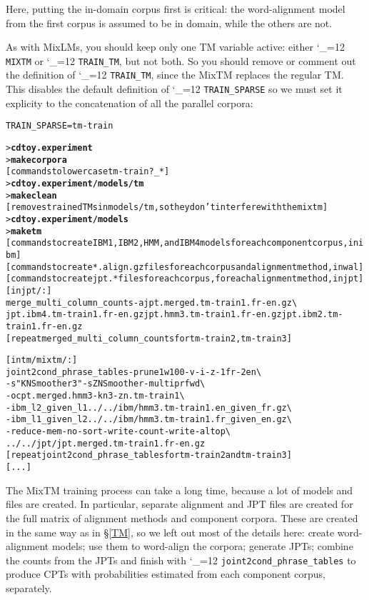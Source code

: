 \documentclass[11pt,letterpaper]{article}
\newcommand{\bs}{\textbackslash{}}
\def\code{\begingroup\catcode`\_=12 \codex}
\newcommand{\codex}[1]{\texttt{#1}\endgroup}
\begin{document}
Here, putting the in-domain corpus first is critical:
the word-alignment model from the first corpus is assumed to be
in domain, while the others are not.

As with MixLMs, you should keep only one TM variable active: either \code{MIXTM} or \code{TRAIN_TM}, but not both.
So you should remove or comment out the definition of \code{TRAIN_TM}, since the
MixTM replaces the regular TM.
This disables the default definition of \code{TRAIN_SPARSE}
so we must set it explicity to the concatenation of all the parallel corpora:
\begin{small}
\begin{alltt}
   TRAIN_SPARSE = tm-train
\end{alltt}
\end{small}

\begin{small}
\begin{alltt}
   > \textbf{cd toy.experiment}
   > \textbf{make corpora}
   [commands to lowercase tm-train?_*]
   > \textbf{cd toy.experiment/models/tm}
   > \textbf{make clean}
   [removes trained TMs in models/tm, so they don't interfere with the mixtm]
   > \textbf{cd toy.experiment/models}
   > \textbf{make tm}
   [commands to create IBM1, IBM2, HMM, and IBM4 models for each component corpus, in ibm]
   [commands to create *.align.gz files for each corpus and alignment method, in wal]
   [commands to create jpt.* files for each corpus, for each alignment method, in jpt]
   [in jpt/:]
   merge_multi_column_counts -a jpt.merged.tm-train1.fr-en.gz \bs
      jpt.ibm4.tm-train1.fr-en.gz jpt.hmm3.tm-train1.fr-en.gz jpt.ibm2.tm-train1.fr-en.gz
   [repeat merged_multi_column_counts for tm-train2, tm-train3]

   [in tm/mixtm/:]
   joint2cond_phrase_tables -prune1w 100 -v -i -z -1 fr -2 en \bs
      -s "KNSmoother 3" -s ZNSmoother -multipr fwd \bs
      -o cpt.merged.hmm3-kn3-zn.tm-train1 \bs
      -ibm_l2_given_l1  ../../ibm/hmm3.tm-train1.en_given_fr.gz \bs
      -ibm_l1_given_l2  ../../ibm/hmm3.tm-train1.fr_given_en.gz \bs
      -reduce-mem -no-sort -write-count -write-al top \bs
      ../../jpt/jpt.merged.tm-train1.fr-en.gz
   [repeat joint2cond_phrase_tables for tm-train2 and tm-train3]
   [...]
\end{alltt}
\end{small}

The MixTM training process can take a long time, because a lot of models and
files are created. In particular, separate alignment and JPT files are created
for the full matrix of alignment methods and component corpora.  These are
created in the same way as in \S\ref{TM}, so we left out most of the details
here: create word-alignment models; use them to word-align the corpora;
generate JPTs; combine the counts from the JPTs and finish with
\code{joint2cond_phrase_tables} to produce CPTs with probabilities estimated
from each component corpus, separately.
\end{document}
